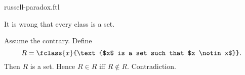 \documentclass{stex}
\begin{document}
\begin{smodule}{russell-paradox.ftl}
  \begin{ftheorem*}[label=russell_paradox,title=Russell's Paradox]
    It is wrong that every class is a set.
  \end{ftheorem*}
  \begin{fproof}
    Assume the contrary.
    Define \[R = \fclass{x}{\text{$x$ is a set such that $x \notin x$}}.\]
    Then $R$ is a set.
    Hence $R \in R$ iff $R \notin R$.
    Contradiction.
  \end{fproof}
\end{smodule}
\end{document}
